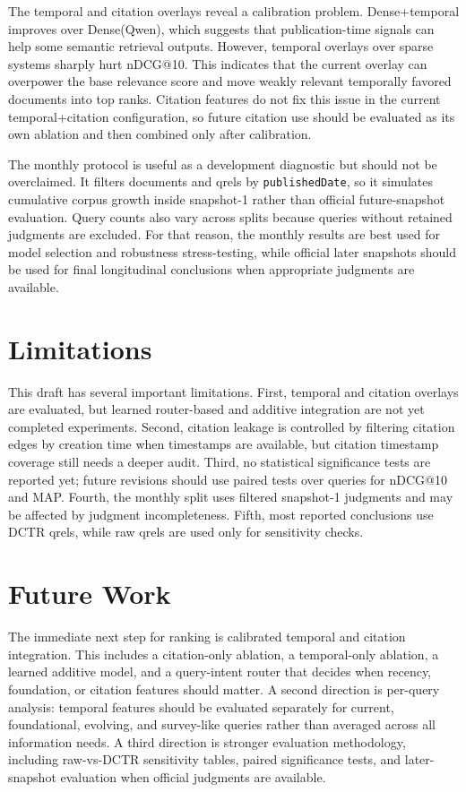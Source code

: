 \documentclass[11pt]{article}
\begin{document}
The temporal and citation overlays reveal a calibration problem. Dense+temporal improves over Dense(Qwen), which suggests that publication-time signals can help some semantic retrieval outputs. However, temporal overlays over sparse systems sharply hurt nDCG@10. This indicates that the current overlay can overpower the base relevance score and move weakly relevant temporally favored documents into top ranks. Citation features do not fix this issue in the current temporal+citation configuration, so future citation use should be evaluated as its own ablation and then combined only after calibration.

The monthly protocol is useful as a development diagnostic but should not be overclaimed. It filters documents and qrels by \texttt{publishedDate}, so it simulates cumulative corpus growth inside snapshot-1 rather than official future-snapshot evaluation. Query counts also vary across splits because queries without retained judgments are excluded. For that reason, the monthly results are best used for model selection and robustness stress-testing, while official later snapshots should be used for final longitudinal conclusions when appropriate judgments are available.

\section{Limitations}

This draft has several important limitations. First, temporal and citation overlays are evaluated, but learned router-based and additive integration are not yet completed experiments. Second, citation leakage is controlled by filtering citation edges by creation time when timestamps are available, but citation timestamp coverage still needs a deeper audit. Third, no statistical significance tests are reported yet; future revisions should use paired tests over queries for nDCG@10 and MAP. Fourth, the monthly split uses filtered snapshot-1 judgments and may be affected by judgment incompleteness. Fifth, most reported conclusions use DCTR qrels, while raw qrels are used only for sensitivity checks.

\section{Future Work}

The immediate next step for ranking is calibrated temporal and citation integration. This includes a citation-only ablation, a temporal-only ablation, a learned additive model, and a query-intent router that decides when recency, foundation, or citation features should matter. A second direction is per-query analysis: temporal features should be evaluated separately for current, foundational, evolving, and survey-like queries rather than averaged across all information needs. A third direction is stronger evaluation methodology, including raw-vs-DCTR sensitivity tables, paired significance tests, and later-snapshot evaluation when official judgments are available.
\end{document}
